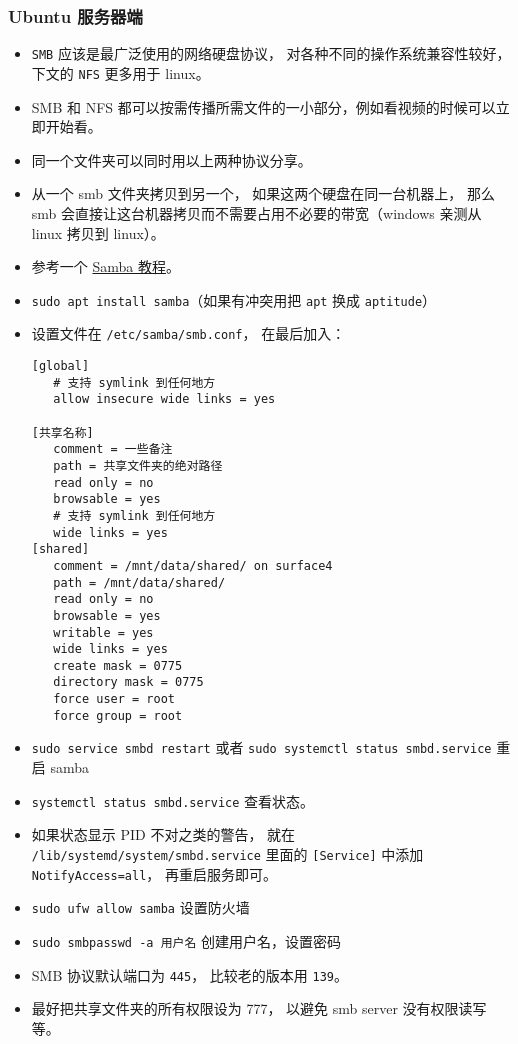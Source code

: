 \subsubsection{Ubuntu 服务器端}
\begin{itemize}
\item \verb`SMB` 应该是最广泛使用的网络硬盘协议， 对各种不同的操作系统兼容性较好， 下文的 \verb`NFS` 更多用于 linux。
\item SMB 和 NFS 都可以按需传播所需文件的一小部分，例如看视频的时候可以立即开始看。
\item 同一个文件夹可以同时用以上两种协议分享。
\item 从一个 smb 文件夹拷贝到另一个， 如果这两个硬盘在同一台机器上， 那么 smb 会直接让这台机器拷贝而不需要占用不必要的带宽（windows 亲测从 linux 拷贝到 linux）。
\item 参考一个 \href{https://ubuntu.com/tutorials/install-and-configure-samba}{Samba 教程}。
\item \verb`sudo apt install samba`（如果有冲突用把 \verb`apt` 换成 \verb`aptitude`）
\item 设置文件在 \verb`/etc/samba/smb.conf`， 在最后加入：
\begin{lstlisting}[language=none]
[global]
   # 支持 symlink 到任何地方
   allow insecure wide links = yes

[共享名称]
   comment = 一些备注
   path = 共享文件夹的绝对路径
   read only = no
   browsable = yes
   # 支持 symlink 到任何地方
   wide links = yes
[shared]
   comment = /mnt/data/shared/ on surface4
   path = /mnt/data/shared/
   read only = no
   browsable = yes
   writable = yes
   wide links = yes
   create mask = 0775
   directory mask = 0775
   force user = root
   force group = root
\end{lstlisting}
\item \verb`sudo service smbd restart` 或者 \verb`sudo systemctl status smbd.service` 重启 samba
\item \verb`systemctl status smbd.service` 查看状态。
\item 如果状态显示 PID 不对之类的警告， 就在 \verb`/lib/systemd/system/smbd.service` 里面的 \verb`[Service]` 中添加 \verb`NotifyAccess=all`， 再重启服务即可。
\item \verb`sudo ufw allow samba` 设置防火墙
\item \verb`sudo smbpasswd -a 用户名` 创建用户名，设置密码
\item SMB 协议默认端口为 \verb`445`， 比较老的版本用 \verb`139`。
\item 最好把共享文件夹的所有权限设为 777， 以避免 smb server 没有权限读写等。
\end{itemize}

